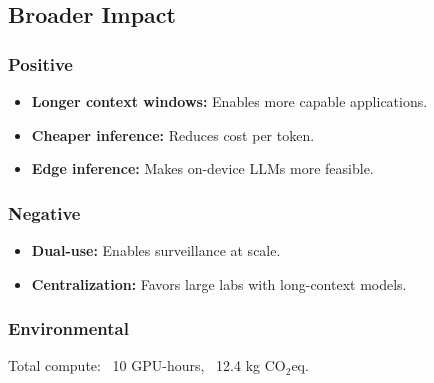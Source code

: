 \subsection{Broader Impact}

\subsubsection{Positive}
\begin{itemize}
\item \textbf{Longer context windows:} Enables more capable applications.
\item \textbf{Cheaper inference:} Reduces cost per token.
\item \textbf{Edge inference:} Makes on-device LLMs more feasible.

\end{itemize}
\subsubsection{Negative}
\begin{itemize}
\item \textbf{Dual-use:} Enables surveillance at scale.
\item \textbf{Centralization:} Favors large labs with long-context models.

\end{itemize}
\subsubsection{Environmental}
Total compute: ~10 GPU-hours, ~12.4 kg CO$_2$eq.